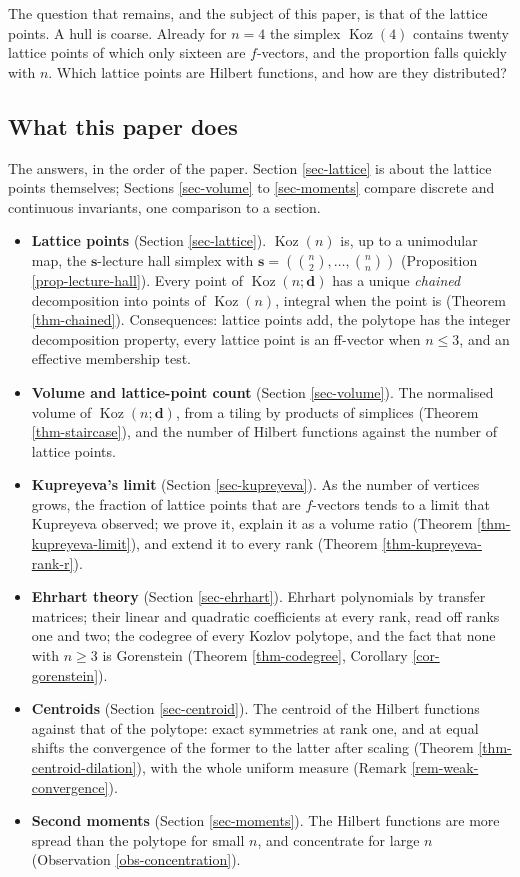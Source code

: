 \documentclass[11pt, a4paper, abstract=yes]{scrartcl}
\theoremstyle{definition}
\theoremstyle{remark}
\theoremstyle{plain}
\newcommand{\vek}[1]{\boldsymbol{#1}}
\theoremstyle{remark}
\theoremstyle{plain}
\newcommand{\Koz}{\operatorname{Koz}}
\begin{document}
The question that remains, and the subject of this paper, is that of the lattice points.
A hull is coarse. Already for \(n=4\) the simplex \(\Koz(4)\) contains twenty lattice points of
which only sixteen are \(f\)-vectors, and the proportion falls quickly with \(n\). Which lattice
points are Hilbert functions, and how are they distributed?
\subsection{What this paper does}
\label{sec:org9497ac6}

The answers, in the order of the paper. Section \ref{sec-lattice} is about the lattice points
themselves; Sections \ref{sec-volume} to \ref{sec-moments} compare discrete and continuous invariants,
one comparison to a section.

\begin{itemize}
\item \textbf{Lattice points} (Section \ref{sec-lattice}). \(\Koz(n)\) is, up to a unimodular map, the
\(\vek s\)-lecture hall simplex with \(\vek s=(\binom n2,\dots,\binom nn)\)
(Proposition \ref{prop-lecture-hall}). Every point of \(\Koz(n;\vek d)\) has a unique \emph{chained}
decomposition into points of \(\Koz(n)\), integral when the point is (Theorem \ref{thm-chained}).
Consequences: lattice points add, the polytope has the integer decomposition property, every
lattice point is an ff-vector when \(n\le3\), and an effective membership test.
\item \textbf{Volume and lattice-point count} (Section \ref{sec-volume}). The normalised volume of
\(\Koz(n;\vek d)\), from a tiling by products of simplices (Theorem \ref{thm-staircase}), and the
number of Hilbert functions against the number of lattice points.
\item \textbf{Kupreyeva's limit} (Section \ref{sec-kupreyeva}). As the number of vertices grows, the fraction of
lattice points that are \(f\)-vectors tends to a limit that Kupreyeva observed; we prove it,
explain it as a volume ratio (Theorem \ref{thm-kupreyeva-limit}), and extend it to every rank
(Theorem \ref{thm-kupreyeva-rank-r}).
\item \textbf{Ehrhart theory} (Section \ref{sec-ehrhart}). Ehrhart polynomials by transfer matrices; their
linear and quadratic coefficients at every rank, read off ranks one and two; the codegree of
every Kozlov polytope, and the fact that none with \(n\ge3\) is Gorenstein
(Theorem \ref{thm-codegree}, Corollary \ref{cor-gorenstein}).
\item \textbf{Centroids} (Section \ref{sec-centroid}). The centroid of the Hilbert functions against that of
the polytope: exact symmetries at rank one, and at equal shifts the convergence of the former to
the latter after scaling (Theorem \ref{thm-centroid-dilation}), with the whole uniform measure
(Remark \ref{rem-weak-convergence}).
\item \textbf{Second moments} (Section \ref{sec-moments}). The Hilbert functions are more spread than the
polytope for small \(n\), and concentrate for large \(n\) (Observation \ref{obs-concentration}).
\end{itemize}
\end{document}
